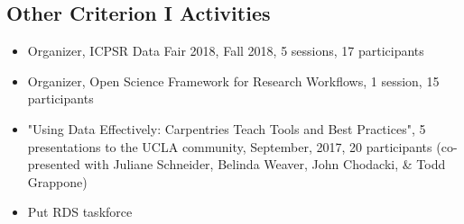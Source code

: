 \subsection{Other Criterion I Activities}
\begin{itemize}[label={}]
  \item Organizer, ICPSR Data Fair 2018, Fall 2018, 5 sessions, 17 participants
  \item Organizer, Open Science Framework for Research Workflows, 1 session,	15 participants
  \item "Using Data Effectively: Carpentries Teach Tools and Best Practices", 5 presentations to the UCLA community, September, 2017,	20 participants (co-presented with Juliane Schneider, Belinda Weaver, John Chodacki, \& Todd Grappone)
  \item Put RDS taskforce
\end{itemize}
